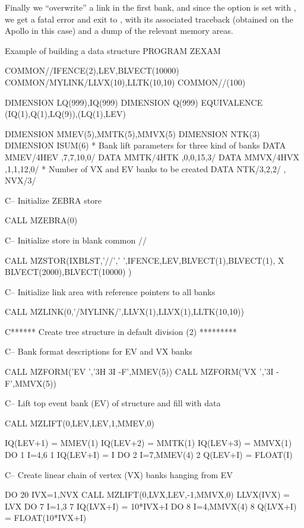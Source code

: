 Finally we ``overwrite'' a link in the first  bank, and since
the  option is set with , we get a fatal error and exit
to , with its associated traceback (obtained on the Apollo in this case)
and a dump of the relevant memory areas.

\newpage
\begin{XMPt}{Example of building a data structure}
      PROGRAM ZEXAM

      COMMON//IFENCE(2),LEV,BLVECT(10000)
      COMMON/MYLINK/LLVX(10),LLTK(10,10)
      COMMON/\QUEST/\IQUEST(100)

      DIMENSION LQ(999),IQ(999)
      DIMENSION  Q(999)
      EQUIVALENCE (IQ(1),Q(1),LQ(9)),(LQ(1),LEV)
 
      DIMENSION MMEV(5),MMTK(5),MMVX(5)
      DIMENSION NTK(3)
      DIMENSION ISUM(6)
*       Bank lift parameters for three kind of banks 
      DATA MMEV/4HEV  ,7,7,10,0/
      DATA MMTK/4HTK  ,0,0,15,3/
      DATA MMVX/4HVX  ,1,1,12,0/
*       Number of VX and EV banks to be created 
      DATA NTK/3,2,2/ , NVX/3/
 
C--     Initialize ZEBRA store
 
      CALL MZEBRA(0)
 
C--     Initialize store in blank common //
 
      CALL MZSTOR(IXBLST,'//',' ',IFENCE,LEV,BLVECT(1),BLVECT(1),
     X            BLVECT(2000),BLVECT(10000)                )
 
C--     Initialize link area with reference pointers to all banks
 
      CALL MZLINK(0,'/MYLINK/',LLVX(1),LLVX(1),LLTK(10,10))

C****** Create tree structure in default division (2) *********
 
C--       Bank format descriptions for EV and VX banks
 
      CALL MZFORM('EV  ','3H 3I -F',MMEV(5))
      CALL MZFORM('VX  ','3I -F',MMVX(5))
 
C--       Lift top event bank (EV) of structure and fill with data
 
      CALL MZLIFT(0,LEV,LEV,1,MMEV,0)
 
      IQ(LEV+1) = MMEV(1)
      IQ(LEV+2) = MMTK(1)
      IQ(LEV+3) = MMVX(1)
      DO 1 I=4,6
    1 IQ(LEV+I) = I
      DO 2 I=7,MMEV(4)
    2 Q(LEV+I) = FLOAT(I)
 
C--       Create linear chain of vertex (VX) banks hanging from EV
 
      DO 20 IVX=1,NVX
          CALL MZLIFT(0,LVX,LEV,-1,MMVX,0)
          LLVX(IVX) = LVX
          DO 7 I=1,3
    7     IQ(LVX+I) = 10*IVX+I
          DO 8 I=4,MMVX(4)
    8     Q(LVX+I) = FLOAT(10*IVX+I)
 

\end{XMPt}
